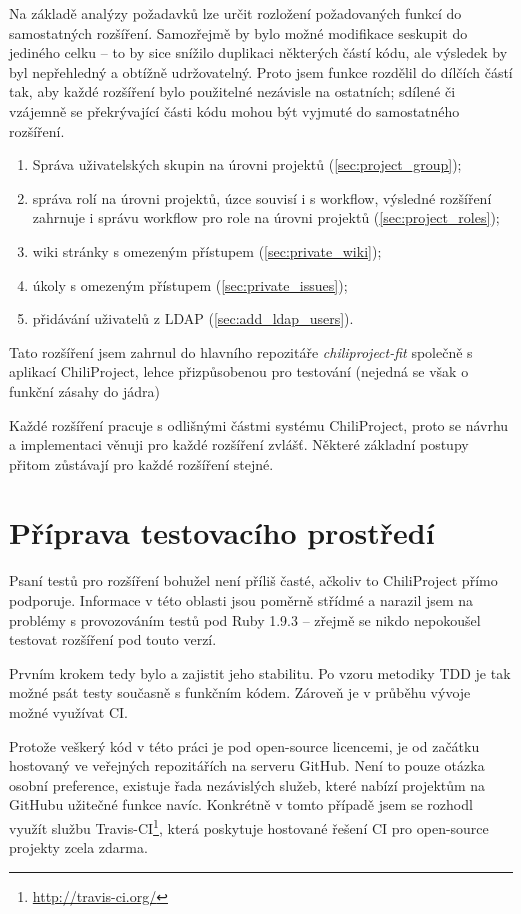 \documentclass[thesis=B,czech]{FITthesis}[2012/05/02]
\begin{document}
Na základě analýzy požadavků lze určit rozložení požadovaných
funkcí do samostatných rozšíření. Samozřejmě by bylo možné modifikace
seskupit do jediného celku -- to by sice snížilo duplikaci některých částí kódu,
ale výsledek by byl nepřehledný a obtížně udržovatelný. Proto jsem funkce
rozdělil do dílčích částí tak, aby každé rozšíření bylo použitelné
nezávisle na ostatních; sdílené či vzájemně se překrývající části kódu
mohou být vyjmuté do samostatného rozšíření.

\begin{enumerate}
\item Správa uživatelských skupin na úrovni projektů (\ref{sec:project_group});
\item správa rolí na úrovni projektů, úzce souvisí i s \gls{workflow}, výsledné rozšíření zahrnuje i
správu workflow pro role na úrovni projektů (\ref{sec:project_roles});
\item wiki stránky s omezeným přístupem (\ref{sec:private_wiki});
\item úkoly s omezeným přístupem (\ref{sec:private_issues});
\item přidávání uživatelů z \gls{LDAP} (\ref{sec:add_ldap_users}).
\end{enumerate}

Tato rozšíření jsem zahrnul do hlavního repozitáře
\emph{chiliproject-fit} společně s aplikací ChiliProject, lehce
přizpůsobenou pro testování (nejedná se však o funkční zásahy do jádra)

Každé rozšíření pracuje s odlišnými částmi systému ChiliProject, proto
se návrhu a implementaci věnuji pro každé rozšíření zvlášť. Některé
základní postupy přitom zůstávají pro každé rozšíření stejné.

\section{Příprava testovacího prostředí}

Psaní testů pro rozšíření bohužel není příliš časté, ačkoliv to
ChiliProject přímo podporuje. Informace v této oblasti jsou poměrně
střídmé a narazil jsem na problémy s provozováním testů pod Ruby 1.9.3
-- zřejmě se nikdo nepokoušel testovat rozšíření pod touto verzí.

Prvním krokem tedy bylo  a zajistit
jeho stabilitu. Po vzoru metodiky \gls{TDD} je tak možné psát testy
současně s funkčním kódem. Zároveň je v průběhu vývoje možné využívat
\gls{CI}.

Protože veškerý kód v této práci je pod open-source licencemi,
je od začátku hostovaný ve veřejných repozitářích na serveru GitHub.
Není to pouze otázka osobní preference, existuje řada nezávislých služeb,
které nabízí projektům na GitHubu užitečné funkce navíc. Konkrétně
v tomto případě jsem se rozhodl využít službu Travis-CI\footnote{\url{http://travis-ci.org/}},
která poskytuje hostované řešení \gls{CI} pro open-source projekty zcela zdarma.
\end{document}
